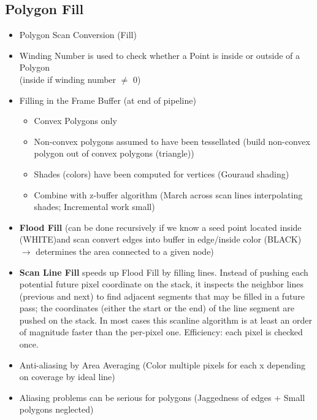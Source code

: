 \documentclass[11pt,a4paper]{article}
\begin{document}
	\subsection{Polygon Fill}
		\begin{itemize}
			\item Polygon Scan Conversion (Fill)
			\item Winding Number is used to check whether a Point is inside or outside of a Polygon\\
				(inside if winding number $\ne$ 0)
			\item Filling in the Frame Buffer (at end of pipeline)
				\begin{itemize}
					\item Convex Polygons only
					\item Non-convex polygons assumed to have been tessellated (build non-convex polygon out of convex polygons (triangle))
					\item Shades (colors) have been computed for vertices (Gouraud shading)
					\item Combine with z-buffer algorithm (March across scan lines interpolating shades; Incremental work small)
				\end{itemize}
			\item \textbf{Flood Fill} (can be done recursively if we know a seed point located inside (WHITE)and scan convert edges into buffer in edge/inside color
			(BLACK) $\rightarrow$ determines the area connected to a given node)
			\item \textbf{Scan Line Fill} speeds up Flood Fill by filling lines. Instead of pushing each potential future pixel coordinate on the stack, it inspects the neighbor lines (previous and next) to find adjacent segments that may be filled in a future pass; the coordinates (either the start or the end) of the line segment are pushed on the stack. In most cases this scanline algorithm is at least an order of magnitude faster than the per-pixel one.
			Efficiency: each pixel is checked once.
			\item Anti-aliasing by Area Averaging (Color multiple pixels for each x depending on coverage by ideal line)
			\item Aliasing problems can be serious for polygons (Jaggedness of edges + Small polygons neglected)
		\end{itemize}
\end{document}
